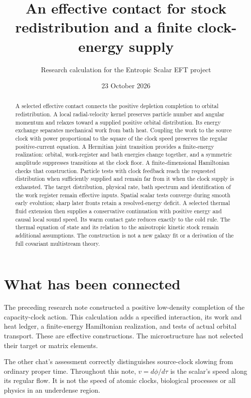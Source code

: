 \documentclass[11pt]{article}
\title{An effective contact for stock redistribution and a finite clock-energy supply}
\author{Research calculation for the Entropic Scalar EFT project}
\date{23 October 2026}
\begin{document}
\maketitle
\begin{abstract}
A selected effective contact connects the positive depletion completion to
orbital redistribution. A local radial-velocity kernel preserves particle
number and angular momentum and relaxes toward a supplied positive orbital
distribution. Its energy exchange separates mechanical work from bath heat.
Coupling the work to the source clock with power proportional to the square
of the clock speed preserves the regular positive-current equation. A
Hermitian joint transition provides a finite-energy realization: orbital,
work-register and bath energies change together, and a symmetric amplitude
suppresses transitions at the clock floor. A finite-dimensional Hamiltonian
checks that construction. Particle tests with clock feedback reach the
requested distribution when sufficiently supplied and remain far from it
when the clock supply is exhausted. The target distribution, physical rate,
bath spectrum and identification of the work register remain effective inputs.
Spatial scalar tests converge during smooth early evolution; sharp later
fronts retain a resolved-energy deficit. A selected thermal fluid extension
then supplies a conservative continuation with positive energy and causal
local sound speed. Its warm contact gate reduces exactly to the cold rule.
The thermal equation of state and its relation to the anisotropic kinetic
stock remain additional assumptions. The construction is not a new galaxy
fit or a derivation of the full covariant multistream theory.
\end{abstract}

\section{What has been connected}
The preceding research note constructed a positive low-density completion
of the capacity-clock action. This calculation adds a specified interaction,
its work and heat ledger, a finite-energy Hamiltonian realization, and tests
of actual orbital transport. These are effective constructions. The
microstructure has not selected their target or matrix elements.

The other chat's assessment correctly distinguishes source-clock slowing
from ordinary proper time. Throughout this note, $v=d\phi/d\tau$ is the
scalar's speed along its regular flow. It is not the speed of atomic clocks,
biological processes or all physics in an underdense region.
\end{document}
